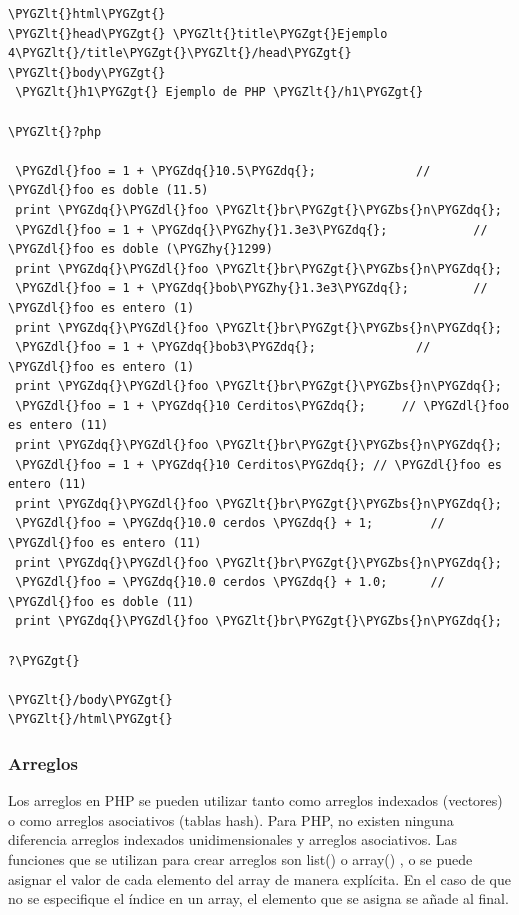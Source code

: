 \documentclass[a5paper,10pt,spanish]{sphinxmanual}
\def\PYGZbs{\char`\\}
\def\PYGZlt{\char`\<}
\def\PYGZgt{\char`\>}
\def\PYGZdl{\char`\$}
\def\PYGZhy{\char`\-}
\def\PYGZdq{\char`\"}
\begin{document}
\begin{Verbatim}[commandchars=\\\{\}]
\PYGZlt{}html\PYGZgt{}
\PYGZlt{}head\PYGZgt{} \PYGZlt{}title\PYGZgt{}Ejemplo 4\PYGZlt{}/title\PYGZgt{}\PYGZlt{}/head\PYGZgt{}
\PYGZlt{}body\PYGZgt{}
 \PYGZlt{}h1\PYGZgt{} Ejemplo de PHP \PYGZlt{}/h1\PYGZgt{}

\PYGZlt{}?php

 \PYGZdl{}foo = 1 + \PYGZdq{}10.5\PYGZdq{};              // \PYGZdl{}foo es doble (11.5)
 print \PYGZdq{}\PYGZdl{}foo \PYGZlt{}br\PYGZgt{}\PYGZbs{}n\PYGZdq{};
 \PYGZdl{}foo = 1 + \PYGZdq{}\PYGZhy{}1.3e3\PYGZdq{};            // \PYGZdl{}foo es doble (\PYGZhy{}1299)
 print \PYGZdq{}\PYGZdl{}foo \PYGZlt{}br\PYGZgt{}\PYGZbs{}n\PYGZdq{};
 \PYGZdl{}foo = 1 + \PYGZdq{}bob\PYGZhy{}1.3e3\PYGZdq{};         // \PYGZdl{}foo es entero (1)
 print \PYGZdq{}\PYGZdl{}foo \PYGZlt{}br\PYGZgt{}\PYGZbs{}n\PYGZdq{};
 \PYGZdl{}foo = 1 + \PYGZdq{}bob3\PYGZdq{};              // \PYGZdl{}foo es entero (1)
 print \PYGZdq{}\PYGZdl{}foo \PYGZlt{}br\PYGZgt{}\PYGZbs{}n\PYGZdq{};
 \PYGZdl{}foo = 1 + \PYGZdq{}10 Cerditos\PYGZdq{};     // \PYGZdl{}foo es entero (11)
 print \PYGZdq{}\PYGZdl{}foo \PYGZlt{}br\PYGZgt{}\PYGZbs{}n\PYGZdq{};
 \PYGZdl{}foo = 1 + \PYGZdq{}10 Cerditos\PYGZdq{}; // \PYGZdl{}foo es entero (11)
 print \PYGZdq{}\PYGZdl{}foo \PYGZlt{}br\PYGZgt{}\PYGZbs{}n\PYGZdq{};
 \PYGZdl{}foo = \PYGZdq{}10.0 cerdos \PYGZdq{} + 1;        // \PYGZdl{}foo es entero (11)
 print \PYGZdq{}\PYGZdl{}foo \PYGZlt{}br\PYGZgt{}\PYGZbs{}n\PYGZdq{};
 \PYGZdl{}foo = \PYGZdq{}10.0 cerdos \PYGZdq{} + 1.0;      // \PYGZdl{}foo es doble (11)
 print \PYGZdq{}\PYGZdl{}foo \PYGZlt{}br\PYGZgt{}\PYGZbs{}n\PYGZdq{};

?\PYGZgt{}

\PYGZlt{}/body\PYGZgt{}
\PYGZlt{}/html\PYGZgt{}
\end{Verbatim}


\subsubsection{Arreglos}
\label{Tutorial1_Conceptos.md:arreglos}
Los arreglos en PHP se pueden utilizar tanto como arreglos indexados
(vectores) o como arreglos asociativos (tablas hash). Para PHP, no
existen ninguna diferencia arreglos indexados unidimensionales y
arreglos asociativos. Las funciones que se utilizan para crear arreglos
son list() o
array() , o se puede asignar el
valor de cada elemento del array de manera explícita. En el caso de que
no se especifique el índice en un array, el elemento que se asigna se
añade al final.
\end{document}
